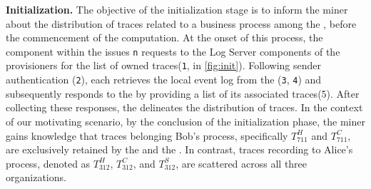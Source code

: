 \textbf{Initialization.} The objective of the initialization stage is to inform the miner about the distribution of traces related to a business process among the , before the commencement of the computation. At the onset of this process, the  component within the  issues \texttt{n} requests to the Log Server components of the provisioners for the list of owned traces(\texttt{1}, in \cref{fig:init}). Following sender authentication (\texttt{2}), each  retrieves the local event log from the  (\texttt{3}, \texttt{4}) and subsequently responds to the  by providing a list of its associated traces(5). After collecting these  responses, the  delineates the distribution of traces. In the context of our motivating scenario, by the conclusion of the initialization phase, the miner gains knowledge that traces belonging Bob's process, specifically $T^H_{711}$ and $T^C_{711}$, are exclusively retained by the  and the . In contrast, traces recording to Alice's process, denoted as $T^H_{312}$, $T^C_{312}$, and $T^S_{312}$, are scattered across all three organizations.


